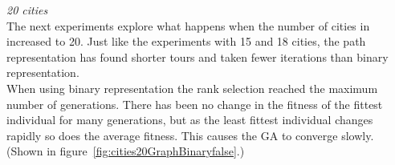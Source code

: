 \documentclass[10pt,a4paper,openbib]{article}
\begin{document}
\begin{multicols}{2}
\noindent \textit{20 cities} \\

\noindent The next experiments explore what happens when the number of cities in increased to 20. Just like the experiments with 15 and 18 cities, the path representation has found shorter tours and taken fewer iterations than binary representation. \\

\noindent When using binary representation the rank selection reached the maximum number of generations. There has been no change in the fitness of the fittest individual for many generations, but as the least fittest individual changes rapidly so does the average fitness. This causes the GA to converge slowly. (Shown in figure~\ref{fig:cities20GraphBinaryfalse}.) \\



\end{multicols}
\end{document}
